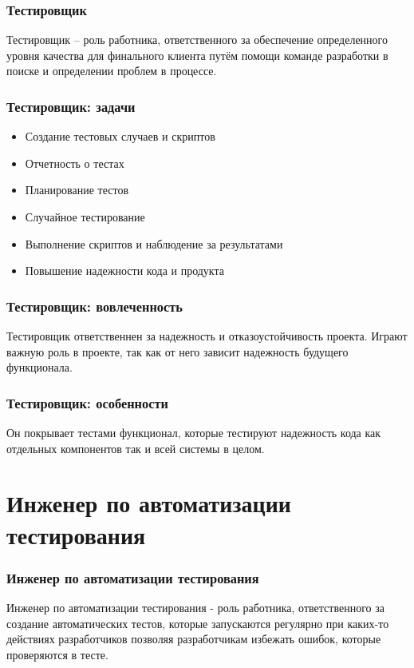 \documentclass{../industrial-development}
\begin{document}
	\begin{frame} \frametitle{Тестировщик}
		\begin{block}{}
			\alert {Тестировщик} – роль работника, ответственного за обеспечение определенного уровня качества для финального клиента путём помощи команде разработки в поиске и определении проблем в процессе.
		\end{block}
		
	\end{frame}
	
	\begin{frame} \frametitle{Тестировщик: задачи}
		\begin{itemize}
			\item Создание тестовых случаев и скриптов
			\item Отчетность о тестах
			\item Планирование тестов
			\item Случайное тестирование
			\item Выполнение скриптов и наблюдение за результатами 
			\item Повышение надежности кода и продукта
		\end{itemize}
	\end{frame}
	
	\begin{frame} \frametitle{Тестировщик: вовлеченность}
		Тестировщик ответственнен за надежность и отказоустойчивость проекта. Играют важную роль в проекте, так как от него зависит надежность будущего функционала.
	\end{frame}
	
	\begin{frame} \frametitle{Тестировщик: особенности}
		Он покрывает тестами функционал, которые тестируют надежность кода как отдельных компонентов так и всей системы в целом. 
	\end{frame}
	
	\section{Инженер по автоматизации тестирования}
	
	\begin{frame} \frametitle{Инженер по автоматизации тестирования}
		\begin{block}{}
			\alert {Инженер по автоматизации тестирования} - роль работника, ответственного за создание автоматических тестов, которые запускаются регулярно при каких-то действиях разработчиков позволяя разработчикам избежать ошибок, которые проверяются в тесте.
		\end{block}
		
	\end{frame}
	
\end{document}
